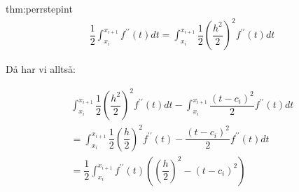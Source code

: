 \begin{lem}{thm:perrstepint}
   \begin{equation*}
     \begin{gathered}
       \dfrac{1}{2}\int_{x_i}^{x_{i+1}}f^{\prime\prime}(t)dt =\int_{x_i}^{x_{i+1}}\dfrac{1}{2}\left(\dfrac{h^2}{2}\right)^2f^{\prime\prime}(t)dt
     \end{gathered}
   \end{equation*}
   \par\bigskip
   \noindent Då har vi alltså:


   \begin{equation*}
     \begin{gathered}
       \int_{x_i}^{x_{i+1}}\dfrac{1}{2}\left(\dfrac{h^2}{2}\right)^2f^{\prime\prime}(t)dt -\int_{x_i}^{x_{i+1}}\dfrac{(t-c_i)^2}{2}f^{\prime\prime}(t)dt\\
     = \int_{x_i}^{x_{i+1}}\dfrac{1}{2}\left(\dfrac{h}{2}\right)^2f^{\prime\prime}(t)-\dfrac{(t-c_i)^2}{2}f^{\prime\prime}(t)dt\\
     = \dfrac{1}{2}\int_{x_i}^{x_{i+1}}f^{\prime\prime}(t)\left(\left(\dfrac{h}{2}\right)^2-(t-c_i)^2\right)
     \end{gathered}
   \end{equation*}
 
\end{lem}
\pagebreak
